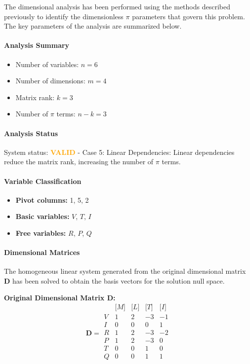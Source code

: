 The dimensional analysis has been performed using the methods described previously to identify the dimensionless $\pi$ parameters that govern this problem. The key parameters of the analysis are summarized below.

\paragraph{Analysis Summary}
\begin{itemize}
\item Number of variables: $n = 6$
\item Number of dimensions: $m = 4$
\item Matrix rank: $k = 3$
\item Number of $\pi$ terms: $n - k = 3$
\end{itemize}

\paragraph{Analysis Status}
System status: \textcolor{orange}{\textbf{VALID}} - Case 5: Linear Dependencies: Linear dependencies reduce the matrix rank, increasing the number of $\pi$ terms.


\paragraph{Variable Classification}
\begin{itemize}
\item \textbf{Pivot columns:} 1, 5, 2
\item \textbf{Basic variables:} $V$, $T$, $I$
\item \textbf{Free variables:} $R$, $P$, $Q$
\end{itemize}

                \paragraph{Dimensional Matrices}
                The homogeneous linear system generated from the original dimensional matrix $\mathbf{D}$ has been solved to obtain the basis vectors for the solution null space.

                \textbf{Original Dimensional Matrix $\mathbf{D}$:}
                \[\mathbf{D} = \begin{array}{r|rrrr}
                & \text{[}M\text{]} & \text{[}L\text{]} & \text{[}T\text{]} & \text{[}I\text{]} \\
                \hline
                V & 1 & 2 & -3 & -1 \\
I & 0 & 0 & 0 & 1 \\
R & 1 & 2 & -3 & -2 \\
P & 1 & 2 & -3 & 0 \\
T & 0 & 0 & 1 & 0 \\
Q & 0 & 0 & 1 & 1 \\

                \end{array}\]


